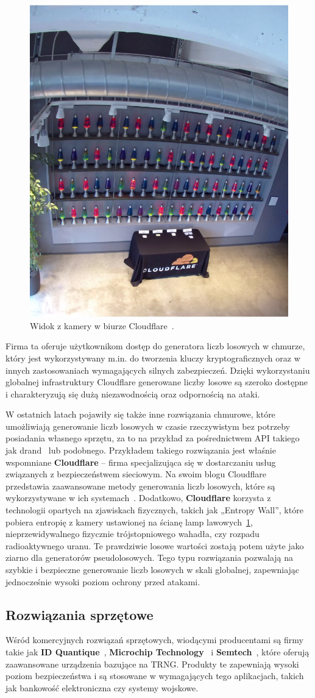 \begin{figure}[h]
    \centering
    \includegraphics[width=0.4\linewidth]{chapters/02-teoria/figures/lavarandCamera}
    \caption{Widok z kamery w biurze Cloudflare~\cite{cloudflare_lavarand}.}
    \label{fig:lavarand}
\end{figure}

Firma ta oferuje użytkownikom dostęp do generatora liczb losowych w chmurze, który jest wykorzystywany
m.in. do tworzenia kluczy kryptograficznych oraz w innych zastosowaniach wymagających silnych zabezpieczeń.
Dzięki wykorzystaniu globalnej infrastruktury Cloudflare generowane liczby losowe są
szeroko dostępne i charakteryzują się dużą niezawodnością oraz odpornością na ataki.

W ostatnich latach pojawiły się także inne rozwiązania chmurowe, które umożliwiają generowanie liczb losowych w czasie rzeczywistym bez potrzeby posiadania własnego sprzętu,
za to na przykład za pośrednictwem API takiego jak drand~\cite{drand_documentation} lub podobnego.
Przykładem takiego rozwiązania jest właśnie wspomniane \textbf{Cloudflare} – firma specjalizująca się w dostarczaniu usług związanych z bezpieczeństwem sieciowym.
Na swoim blogu Cloudflare przedstawia zaawansowane metody generowania liczb losowych, które są wykorzystywane w ich systemach~\cite{cloudflare_league_of_entropy}.
Dodatkowo, \textbf{Cloudflare} korzysta z technologii opartych na zjawiskach fizycznych, takich jak „Entropy Wall”, które pobiera entropię z kamery
ustawionej na ścianę lamp lawowych~\ref{fig:lavarand}, nieprzewidywalnego fizycznie trójstopniowego wahadła, czy rozpadu radioaktywnego uranu.
Te prawdziwie losowe wartości zostają potem użyte jako ziarno dla generatorów pseudolosowych.
Tego typu rozwiązania pozwalają na szybkie i bezpieczne generowanie liczb losowych w skali globalnej, zapewniając jednocześnie wysoki poziom ochrony przed atakami.

\subsection{Rozwiązania sprzętowe}\label{subsec:rozwiazania-sprzetowe}
Wśród komercyjnych rozwiązań sprzętowych, wiodącymi producentami są firmy takie jak
\textbf{ID Quantique}~\cite{IDQ}, \textbf{Microchip Technology}~\cite{MicrochipTechnology} i \textbf{Semtech}~\cite{Semtech},
które oferują zaawansowane urządzenia bazujące na TRNG.
Produkty te zapewniają wysoki poziom bezpieczeństwa i są stosowane w wymagających tego aplikacjach,
takich jak bankowość elektroniczna czy systemy wojskowe.

